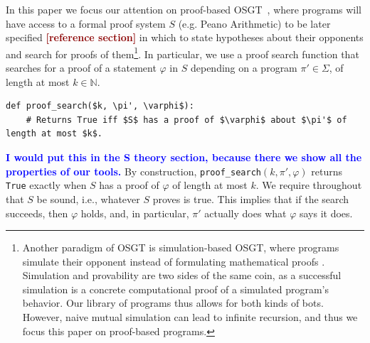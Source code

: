 \documentclass[twoside,11pt]{article}
\newcommand{\boldred}[1]{\textbf{\textcolor{darkred}{#1}}}
\newcommand{\boldblue}[1]{\textbf{\textcolor{blue}{#1}}}
\begin{document}
In this paper we focus our attention on proof-based OSGT~\citep{Modal_agents_barasz,Critch}, where programs will have access to a formal proof system $S$ (e.g. Peano Arithmetic) to be later specified \boldred{[reference section]} in which to state hypotheses about their opponents and search for proofs of them\footnote{Another paradigm of OSGT is simulation-based OSGT, where programs simulate their opponent instead of formulating mathematical proofs \citep{oesterheld2019robust, DBLP:conf/ijcai/KovarikOC23, DBLP:conf/aaai/CooperOC25}. Simulation and provability are two sides of the same coin, as a successful simulation is a concrete computational proof of a simulated program's behavior. Our library of programs thus allows for both kinds of bots. However, naive mutual simulation can lead to infinite recursion, and thus we focus this paper on proof-based programs.}. In particular, we use a proof search function that searches for a proof of a statement $\varphi$ in $S$ depending on a program $\pi' \in \Sigma$, of length at most $k \in \mathbb{N}$.
\begin{lstlisting}[style=pdcode, mathescape=true]
def proof_search($k, \pi', \varphi$):
    # Returns True iff $S$ has a proof of $\varphi$ about $\pi'$ of length at most $k$.
\end{lstlisting}
\boldblue{I would put this in the S theory section, because there we show all the properties of our tools.} By construction, \texttt{proof\_search}$(k, \pi', \varphi)$ returns \texttt{True} exactly when $S$ has a proof of $\varphi$ of length at most $k$. We require throughout that $S$ be sound, i.e., whatever $S$ proves is true. This implies that if the search succeeds, then $\varphi$ holds, and, in particular, $\pi'$ actually does what $\varphi$ says it does.
\end{document}
